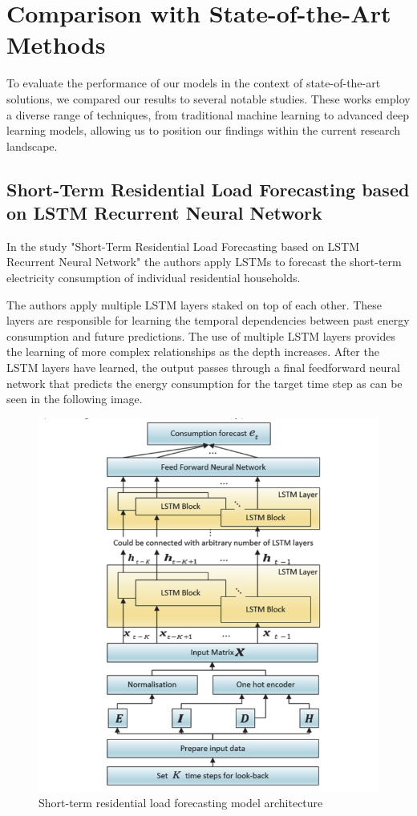 \section{Comparison with State-of-the-Art Methods}
To evaluate the performance of our models in the context of state-of-the-art solutions, we compared our results to several notable studies. These works employ a diverse range of techniques, from traditional machine learning to advanced deep learning models, allowing us to position our findings within the current research landscape.

\subsection{Short-Term Residential Load Forecasting based
on LSTM Recurrent Neural Network}
In the study "Short-Term Residential Load Forecasting based
on LSTM Recurrent Neural Network"\cite{kong2019short} the authors apply LSTMs to forecast the short-term electricity consumption of individual residential households. 

The authors apply multiple LSTM layers staked on top of each other. These layers are responsible for learning the temporal dependencies between past energy consumption and future predictions. The use of multiple LSTM layers provides the learning of more complex relationships as the depth increases. After the LSTM layers have learned, the output passes through a final feedforward neural network that predicts the energy consumption for the target time step as can be seen in the following image.

\begin{figure}[!h]
    \centering
    \includegraphics[width=0.75\linewidth]{images/study_lstm.png}
    \caption{Short-term residential load forecasting model architecture\cite{kong2019short}}
    \label{fig:architecture_lstm_study}
\end{figure}

